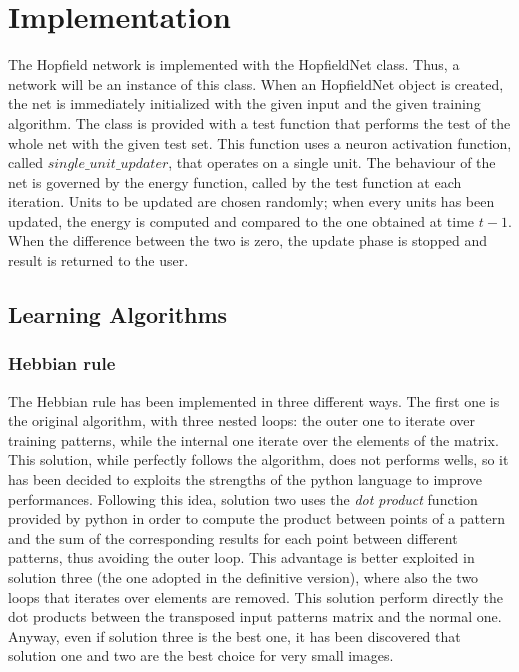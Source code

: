 \documentclass[letterpaper,twocolumn,10pt]{article}
\begin{document}
\section{Implementation}
The Hopfield network is implemented with the HopfieldNet class. Thus, a network will be an instance of this class. When an HopfieldNet object is created, the net is immediately initialized with the given input and the given training algorithm. The class is provided with a test function that performs the test of the whole net with the given test set. This function uses a neuron activation function, called $single\_unit\_updater$, that operates on a single unit. The behaviour of the net is governed by the energy function, called by the test function at each iteration. Units to be updated are chosen randomly; when every units has been updated, the energy is computed and compared to the one obtained at time $t-1$. When the difference between the two is zero, the update phase is stopped and result is returned to the user.

\subsection{Learning Algorithms}

\subsubsection{Hebbian rule}
The Hebbian rule has been implemented in three different ways. The first one is the original algorithm, with three nested loops: the outer one to iterate over training patterns, while the internal one iterate over the elements of the matrix. This solution, while perfectly follows the algorithm, does not performs wells, so it has been decided to exploits the strengths of the python language to improve performances. Following this idea, solution two uses the \emph{dot product} function provided by python in order to compute the product between points of a pattern and the sum of the corresponding results for each point between different patterns, thus avoiding the outer loop. This advantage is better exploited in solution three (the one adopted in the definitive version), where also the two loops that iterates over elements are removed. This solution perform directly the dot products between the transposed input patterns matrix and the normal one. Anyway, even if solution three is the best one, it has been discovered that solution one and two are the best choice for very small images.
\end{document}
